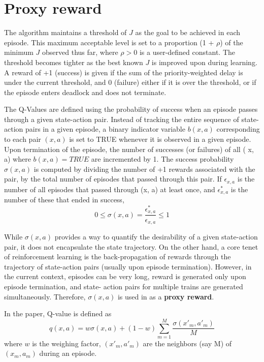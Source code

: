 \section{Proxy reward}

The algorithm maintains a threshold of $J$ as the goal to be
achieved in each episode. This maximum acceptable level is
set to a proportion (1 + $\rho$) of the minimum $J$ observed thus
far, where $\rho > 0$ is a user-defined constant. The threshold
becomes tighter as the best known $J$ is improved upon during
learning. A reward of +1 (success) is given if the sum of the
priority-weighted delay is under the current threshold, and 0
(failure) either if it is over the threshold, or if the episode
enters deadlock and does not terminate.

The Q-Values
are defined using the probability of success when an episode
passes through a given state-action pair. Instead of tracking
the entire sequence of state-action pairs in a given episode,
a binary indicator variable $b( x, a)$ corresponding to each pair
$( x, a)$ is set to TRUE whenever it is observed in a given
episode. Upon termination of the episode, the number of
successes (or failures) of all ( x, a) where $b( x, a) = TRUE$
are incremented by 1. The success probability $\sigma ( x, a)$ is
computed by dividing the number of +1 rewards associated
with the pair, by the total number of episodes that passed
through this pair. If $\epsilon_{x,a}$ is the number of all episodes that
passed through (x, a) at least once, and $\epsilon^{*}_{x,a}$ is the number of these 
that ended in success,
$$ 0 \leq \sigma(x,a) = \frac{\epsilon^{*}_{x,a}}{\epsilon_{x,a}} \leq 1$$

While $ \sigma ( x, a)$ provides a way to quantify the desirability
of a given state-action pair, it does not encapsulate the state
trajectory. On the other hand, a core tenet of reinforcement
learning is the back-propagation of rewards through the trajectory of state-action pairs (usually
upon episode termination).
However, in the current context, episodes can be very long,
reward is generated only upon episode termination, and state-
action pairs for multiple trains are generated simultaneously.
Therefore, $\sigma ( x, a)$ is used in as a \textbf{proxy reward}.

In the paper, Q-value is defined as 
$$ q(x,a) = w\sigma(x,a) + (1-w)\sum_{m=1}^{M}\frac{\sigma(x'_m, a'_m)}{M }  $$
where $w$ is the weighing factor, $(x'_m, a'_m)$ are the neighbors (say M) of $(x_m,a_m)$ during an 
episode. 